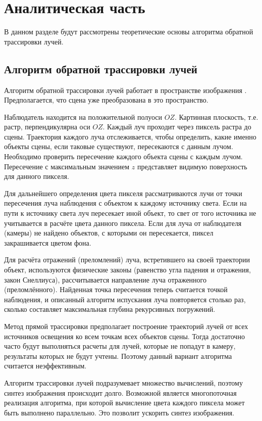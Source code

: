 \chapter{Аналитическая часть}
В данном разделе будут рассмотрены теоретические основы алгоритма обратной трассировки лучей.

\section{Алгоритм обратной трассировки лучей}
Алгоритм обратной трассировки лучей работает в пространстве изображения \cite{web_item2}. Предполагается, что сцена уже преобразована в это пространство.

Наблюдатель находится на положительной полуоси $OZ$. Картинная плоскость, т.е. растр, перпендикулярна оси $OZ$. Каждый луч проходит через пиксель растра до сцены. Траектория каждого луча отслеживается, чтобы определить, какие именно объекты сцены, если таковые существуют, пересекаются с данным лучом. Необходимо проверить пересечение каждого объекта сцены с каждым лучом. Пересечение с максимальным значением $z$ представляет видимую поверхность для данного пикселя.

Для дальнейшего определения цвета пикселя рассматриваются лучи от точки пересечения луча наблюдения с объектом к каждому источнику света. Если на пути к источнику света луч пересекает иной объект, то свет от того источника не учитывается в расчёте цвета данного пиксела. Если для луча от наблюдателя (камеры) не найдено объектов, с которыми он пересекается, пиксел закрашивается цветом фона.

Для расчёта отражений (преломлений) луча, встретившего на своей траектории объект, используются физические законы (равенство угла падения и отражения, закон Снеллиуса), рассчитывается направление луча отраженного (преломлённого). Найденная точка пересечения теперь считается точкой наблюдения, и описанный алгоритм испускания луча повторяется столько раз, сколько составляет максимальная глубина рекурсивных погружений.

Метод прямой трассировки предполагает построение траекторий лучей от всех источников освещения ко всем точкам всех объектов сцены. Тогда достаточно часто будут выполняться расчеты для лучей, которые не попадут в камеру, результаты которых не будут учтены. Поэтому данный вариант алгоритма считается неэффективным.

Алгоритм трассировки лучей подразумевает множество вычислений, поэтому синтез изображения происходит долго. Возможной является многопоточная реализация алгоритма, при которой вычисление цвета каждого пиксела может быть выполнено параллельно. Это позволит ускорить синтез изображения.

